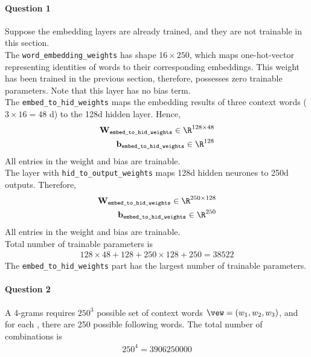 \documentclass{article}
\begin{document}
    \paragraph{Question 1} Suppose the embedding layers are already trained, and they are not trainable in this section. \\
    The \texttt{word\_embedding\_weights} has shape $16 \times 250$, which maps one-hot-vector representing identities of words to their corresponding embeddings. This weight has been trained in the previous section, therefore, possesses zero trainable parameters. Note that this layer has no bias term.\\
    The \texttt{embed\_to\_hid\_weights} maps the embedding results of three context words ($3 \times 16 = 48$ d) to the 128d hidden layer. Hence,
    \begin{align}
    	\textbf{W}_\texttt{embed\_to\_hid\_weights} \in \R^{128 \times 48} \\
    	\textbf{b}_\texttt{embed\_to\_hid\_weights} \in \R^{128}
    \end{align}
    All entries in the weight and bias are trainable. \\
    The layer with \texttt{hid\_to\_output\_weights} maps 128d hidden neurones to 250d outputs. Therefore,
    \begin{align}
    	\textbf{W}_\texttt{embed\_to\_hid\_weights} \in \R^{250 \times 128} \\
    	\textbf{b}_\texttt{embed\_to\_hid\_weights} \in \R^{250}
    \end{align}
    All entries in the weight and bias are trainable. \\
    Total number of trainable parameters is
    \begin{align}
    	128 \times 48 + 128 + 250 \times 128 + 250 = 38522
    \end{align}
    The \texttt{embed\_to\_hid\_weights} part has the largest number of trainable parameters.
    
    \paragraph{Question 2} A 4-grams requires $250^3$ possible set of context words $\vew = (w_1, w_2, w_3)$, and for each \vew, there are 250 possible following words. The total number of combinations is 
    \begin{align}
    	250^4 = 3906250000
    \end{align}
    
\end{document}
